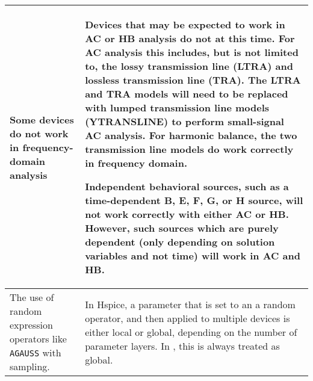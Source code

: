 \begin{longtable}[h] {>{\raggedright\small}m{2in}|>{\raggedright\let\\\tabularnewline\small}m{3.5in}}
    Some devices do not work in frequency-domain analysis & Devices
    that may be expected to work in AC or HB analysis do not at this
    time.  For AC analysis this includes, but is not limited to, the
    lossy transmission line (LTRA) and lossless transmission line
    (TRA).  The LTRA and TRA models will need to be replaced with
    lumped transmission line models (YTRANSLINE) to perform
    small-signal AC analysis.  For harmonic balance, the two
    transmission line models do work correctly in frequency domain.

    Independent behavioral sources, such as a time-dependent B, E, F, G, or H 
    source, will not work correctly with either AC or HB. 
    However, such sources which are purely dependent (only depending on solution 
    variables and not time) will work in AC and HB.
    \\ \hline

    The use of random expression operators like \texttt{AGAUSS} with 
    sampling.
    &   In Hspice, a parameter that is set to an a random operator, 
    and then applied to multiple devices is either local or global, 
    depending on the number of parameter layers.  In \Xyce{}, this 
    is always treated as global.
    \\ \hline

\end{longtable}

